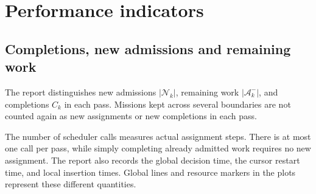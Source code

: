 \section{Performance indicators}
\label{sec:progetto-indicatori}

\subsection{Completions, new admissions and remaining work}

The report distinguishes new admissions $|\mathcal N_k|$, remaining work
$|\mathcal A_k^{-}|$, and completions $C_k$ in each pass. Missions kept across
several boundaries are not counted again as new assignments or new completions
in each pass.

The number of scheduler calls measures actual assignment steps. There is at
most one call per pass, while simply completing already admitted work requires
no new assignment. The report also records the global decision time, the cursor
restart time, and local insertion times. Global lines and resource markers in
the plots represent these different quantities.

